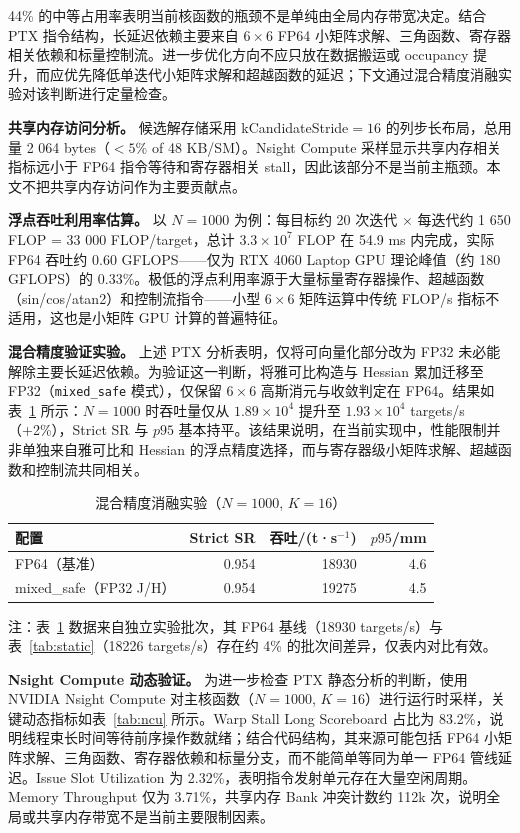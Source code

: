 \documentclass[twocolumn,a4paper,10pt]{ctexart}
\begin{document}
44\% 的中等占用率表明当前核函数的瓶颈不是单纯由全局内存带宽决定。结合 PTX 指令结构，长延迟依赖主要来自 $6\times6$ FP64 小矩阵求解、三角函数、寄存器相关依赖和标量控制流。进一步优化方向不应只放在数据搬运或 occupancy 提升，而应优先降低单迭代小矩阵求解和超越函数的延迟；下文通过混合精度消融实验对该判断进行定量检查。

\textbf{共享内存访问分析。} 候选解存储采用 kCandidateStride$=16$ 的列步长布局，总用量 2 064 bytes（$<5\%$ of 48 KB/SM）。Nsight Compute 采样显示共享内存相关指标远小于 FP64 指令等待和寄存器相关 stall，因此该部分不是当前主瓶颈。本文不把共享内存访问作为主要贡献点。

\textbf{浮点吞吐利用率估算。} 以 $N=1000$ 为例：每目标约 20 次迭代 $\times$ 每迭代约 1 650 FLOP = 33 000 FLOP/target，总计 $3.3\times10^7$ FLOP 在 54.9 ms 内完成，实际 FP64 吞吐约 0.60 GFLOPS——仅为 RTX 4060 Laptop GPU 理论峰值（约 180 GFLOPS）的 0.33\%。极低的浮点利用率源于大量标量寄存器操作、超越函数（sin/cos/atan2）和控制流指令——小型 $6\times6$ 矩阵运算中传统 FLOP/s 指标不适用，这也是小矩阵 GPU 计算的普遍特征。

\textbf{混合精度验证实验。} 上述 PTX 分析表明，仅将可向量化部分改为 FP32 未必能解除主要长延迟依赖。为验证这一判断，将雅可比构造与 Hessian 累加迁移至 FP32（\texttt{mixed\_safe} 模式），仅保留 $6\times6$ 高斯消元与收敛判定在 FP64。结果如表~\ref{tab:mixed} 所示：$N=1000$ 时吞吐量仅从 $1.89\times10^4$ 提升至 $1.93\times10^4$ targets/s（+2\%），Strict SR 与 $p95$ 基本持平。该结果说明，在当前实现中，性能限制并非单独来自雅可比和 Hessian 的浮点精度选择，而与寄存器级小矩阵求解、超越函数和控制流共同相关。

\begin{table}[htbp]
\centering
\caption{混合精度消融实验（$N{=}1000$, $K{=}16$）}
\label{tab:mixed}
\scriptsize
\setlength{\tabcolsep}{3pt}
\begin{tabular}{lrrr}
\toprule
配置 & Strict SR & 吞吐/(t·s$^{-1}$) & $p95$/mm\\
\midrule
FP64（基准） & 0.954 & 18930 & 4.6\\
mixed\_safe（FP32 J/H） & 0.954 & 19275 & 4.5\\
\bottomrule
\end{tabular}
\end{table}

{\footnotesize 注：表~\ref{tab:mixed} 数据来自独立实验批次，其 FP64 基线（18930 targets/s）与表~\ref{tab:static}（18226 targets/s）存在约 4\% 的批次间差异，仅表内对比有效。}

\textbf{Nsight Compute 动态验证。} 为进一步检查 PTX 静态分析的判断，使用 NVIDIA Nsight Compute\cite{ncu} 对主核函数（$N=1000$, $K=16$）进行运行时采样，关键动态指标如表~\ref{tab:ncu} 所示。Warp Stall Long Scoreboard 占比为 83.2\%，说明线程束长时间等待前序操作数就绪；结合代码结构，其来源可能包括 FP64 小矩阵求解、三角函数、寄存器依赖和标量分支，而不能简单等同为单一 FP64 管线延迟。Issue Slot Utilization 为 2.32\%，表明指令发射单元存在大量空闲周期。Memory Throughput 仅为 3.71\%，共享内存 Bank 冲突计数约 112k 次，说明全局或共享内存带宽不是当前主要限制因素。
\end{document}
